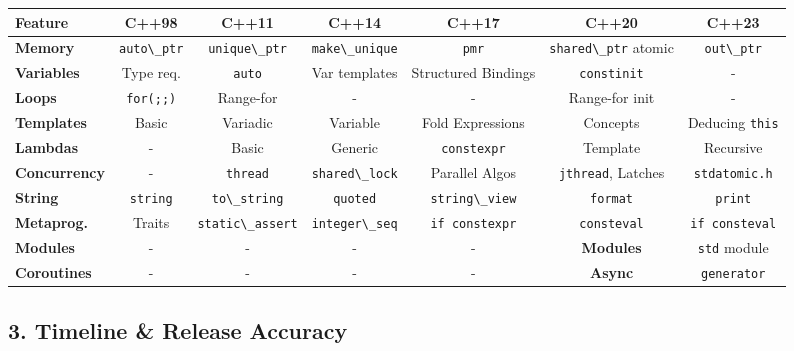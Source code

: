 \begin{longtable}[]{@{}lcccccc@{}}
\toprule
Feature & C++98 & C++11 & C++14 & C++17 & C++20 & C++23 \\
\midrule
\endhead
\textbf{Memory} & \passthrough{\lstinline!auto\_ptr!} &
\passthrough{\lstinline!unique\_ptr!} &
\passthrough{\lstinline!make\_unique!} & \passthrough{\lstinline!pmr!} &
\passthrough{\lstinline!shared\_ptr!} atomic &
\passthrough{\lstinline!out\_ptr!} \\
\textbf{Variables} & Type req. & \passthrough{\lstinline!auto!} & Var
templates & Structured Bindings & \passthrough{\lstinline!constinit!} &
- \\
\textbf{Loops} & \passthrough{\lstinline!for(;;)!} & Range-for & - & - &
Range-for init & - \\
\textbf{Templates} & Basic & Variadic & Variable & Fold Expressions &
Concepts & Deducing \passthrough{\lstinline!this!} \\
\textbf{Lambdas} & - & Basic & Generic &
\passthrough{\lstinline!constexpr!} & Template & Recursive \\
\textbf{Concurrency} & - & \passthrough{\lstinline!thread!} &
\passthrough{\lstinline!shared\_lock!} & Parallel Algos &
\passthrough{\lstinline!jthread!}, Latches &
\passthrough{\lstinline!stdatomic.h!} \\
\textbf{String} & \passthrough{\lstinline!string!} &
\passthrough{\lstinline!to\_string!} & \passthrough{\lstinline!quoted!}
& \passthrough{\lstinline!string\_view!} &
\passthrough{\lstinline!format!} & \passthrough{\lstinline!print!} \\
\textbf{Metaprog.} & Traits & \passthrough{\lstinline!static\_assert!} &
\passthrough{\lstinline!integer\_seq!} &
\passthrough{\lstinline!if constexpr!} &
\passthrough{\lstinline!consteval!} &
\passthrough{\lstinline!if consteval!} \\
\textbf{Modules} & - & - & - & - & \textbf{Modules} &
\passthrough{\lstinline!std!} module \\
\textbf{Coroutines} & - & - & - & - & \textbf{Async} &
\passthrough{\lstinline!generator!} \\
\bottomrule
\end{longtable}

\hypertarget{timeline-release-accuracy}{%
\subsection{3. Timeline \& Release
Accuracy}\label{timeline-release-accuracy}}

